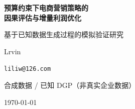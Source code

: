 \documentclass[UTF8, fontset=windows, a4paper, zihao=5]{ctexart}
\begin{document}
\begin{titlepage}
\centering
\vspace*{3.2cm}
{\sffamily\bfseries\fontsize{22pt}{30pt}\selectfont
 预算约束下电商营销策略的\\[6pt]
 因果评估与增量利润优化\par}
\vspace{1.2cm}
{\sffamily\Large 基于已知数据生成过程的模拟验证研究\par}
\vspace{2.4cm}
{\sffamily\large Lrvin\par}
\vspace{0.35cm}
{\sffamily\large \texttt{liliw@126.com}\par}
\vfill
{\sffamily\small 合成数据 / 已知 DGP（非真实企业数据）\par}
\vspace{0.5cm}
{\sffamily\small \today\par}
\end{titlepage}


\newpage

\tableofcontents
\newpage



\clearpage
\printbibliography[heading=bibintoc, title={参考文献}]
\end{document}
